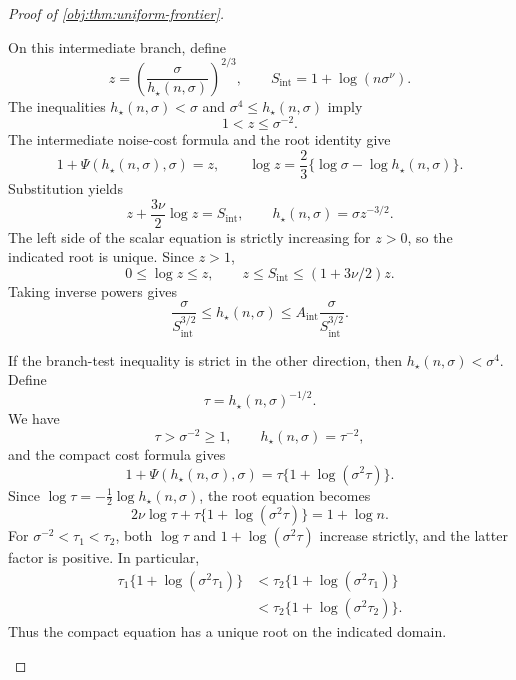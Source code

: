 \documentclass[11pt]{article}
\begin{document}
\begin{proof}[Proof of \cref{obj:thm:uniform-frontier}]
\begin{enumerate}
On this intermediate branch, define
\[
z=\left(\frac{\sigma}{h_\star(n,\sigma)}\right)^{2/3},
\qquad
S_{\mathrm{int}}=1+\log(n\sigma^\nu).
\]
The inequalities \(h_\star(n,\sigma)<\sigma\) and
\(\sigma^4\le h_\star(n,\sigma)\) imply
\[
1<z\le\sigma^{-2}.
\]
The intermediate noise-cost formula and the root identity give
\[
1+\Psi(h_\star(n,\sigma),\sigma)=z,
\qquad
\log z=\frac23\{\log\sigma-\log h_\star(n,\sigma)\}.
\]
Substitution yields
\[
z+\frac{3\nu}{2}\log z=S_{\mathrm{int}},
\qquad
h_\star(n,\sigma)=\sigma z^{-3/2}.
\]
The left side of the scalar equation is strictly increasing for \(z>0\),
so the indicated root is unique. Since \(z>1\),
\[
0\le\log z\le z,
\qquad
z\le S_{\mathrm{int}}\le(1+3\nu/2)z.
\]
Taking inverse powers gives
\[
\frac{\sigma}{S_{\mathrm{int}}^{3/2}}
\le h_\star(n,\sigma)
\le A_{\mathrm{int}}\frac{\sigma}{S_{\mathrm{int}}^{3/2}}.
\]

If the branch-test inequality is strict in the other direction, then
\(h_\star(n,\sigma)<\sigma^4\). Define
\[
\tau=h_\star(n,\sigma)^{-1/2}.
\]
We have
\[
\tau>\sigma^{-2}\ge1,\qquad
h_\star(n,\sigma)=\tau^{-2},
\]
and the compact cost formula gives
\[
1+\Psi(h_\star(n,\sigma),\sigma)
=\tau\{1+\log(\sigma^2\tau)\}.
\]
Since \(\log\tau=-\tfrac12\log h_\star(n,\sigma)\), the root equation becomes
\[
2\nu\log\tau+\tau\{1+\log(\sigma^2\tau)\}
=1+\log n.
\]
For \(\sigma^{-2}<\tau_1<\tau_2\), both
\(\log\tau\) and \(1+\log(\sigma^2\tau)\) increase strictly, and the latter
factor is positive. In particular,
\[
\begin{aligned}
\tau_1\{1+\log(\sigma^2\tau_1)\}
&<\tau_2\{1+\log(\sigma^2\tau_1)\}\\
&<\tau_2\{1+\log(\sigma^2\tau_2)\}.
\end{aligned}
\]
Thus the compact equation has a unique root on the indicated domain.


\end{enumerate}
\end{proof}
\end{document}
